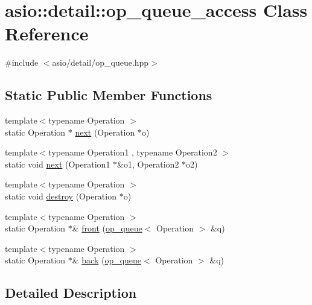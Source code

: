 \hypertarget{classasio_1_1detail_1_1op__queue__access}{}\section{asio\+:\+:detail\+:\+:op\+\_\+queue\+\_\+access Class Reference}
\label{classasio_1_1detail_1_1op__queue__access}


{\ttfamily \#include $<$asio/detail/op\+\_\+queue.\+hpp$>$}

\subsection*{Static Public Member Functions}
\begin{DoxyCompactItemize}
\item 
{\footnotesize template$<$typename Operation $>$ }\\static Operation $\ast$ \hyperlink{classasio_1_1detail_1_1op__queue__access_a073517c9ad7ea32a352ec76a94067aab}{next} (Operation $\ast$o)
\item 
{\footnotesize template$<$typename Operation1 , typename Operation2 $>$ }\\static void \hyperlink{classasio_1_1detail_1_1op__queue__access_a33de1ddb378ceac80ac7120ed2dfd366}{next} (Operation1 $\ast$\&o1, Operation2 $\ast$o2)
\item 
{\footnotesize template$<$typename Operation $>$ }\\static void \hyperlink{classasio_1_1detail_1_1op__queue__access_a143d05ac8d1a98877d6b2bd6e4ea6b55}{destroy} (Operation $\ast$o)
\item 
{\footnotesize template$<$typename Operation $>$ }\\static Operation $\ast$\& \hyperlink{classasio_1_1detail_1_1op__queue__access_a2b10b3da4e10d5ebfc0c497e947462e3}{front} (\hyperlink{classasio_1_1detail_1_1op__queue}{op\+\_\+queue}$<$ Operation $>$ \&q)
\item 
{\footnotesize template$<$typename Operation $>$ }\\static Operation $\ast$\& \hyperlink{classasio_1_1detail_1_1op__queue__access_a1ae0e7d05d583aaba50d6fbf24278707}{back} (\hyperlink{classasio_1_1detail_1_1op__queue}{op\+\_\+queue}$<$ Operation $>$ \&q)
\end{DoxyCompactItemize}


\subsection{Detailed Description}



